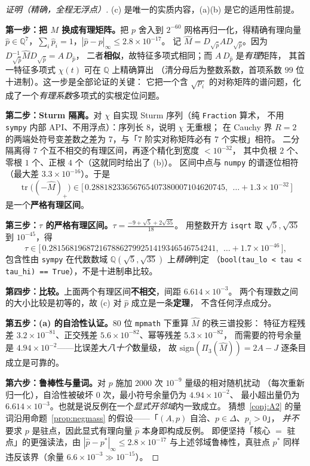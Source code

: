 \documentclass[UTF8,11pt]{ctexart}
\theoremstyle{definition}
\newcommand{\tr}{\operatorname{tr}}
\newcommand{\Q}{\mathbb{Q}}
\begin{document}
\begin{proof}[证明（精确，全程无浮点）]
(c) 是唯一的实质内容，(a)(b) 是它的适用性前提。

\textbf{第一步：把 $M$ 换成有理矩阵。}把 $p$ 舍入到 $2^{-60}$ 网格再归一化，得精确有理向量
$\hat p\in\Q^7$，$\sum_i\hat p_i=1$，$|\hat p-p|_\infty\le2.8\times10^{-17}$。
记 $\hat M=D_{\sqrt{\hat p}}AD_{\sqrt{\hat p}}$。因为
$D_{\sqrt{\hat p}}^{-1}\hat M D_{\sqrt{\hat p}}=A\,D_{\hat p}$，
二者\textbf{相似}，故特征多项式相同；而 $A\,D_{\hat p}$ 是\emph{有理}矩阵，
其首一特征多项式 $\chi(t)$ 可在 $\Q$ 上精确算出
（清分母后为整数系数，首项系数 $99$ 位十进制）。这一步是全部论证的关键：
它把一个含 $\sqrt{p_i}$ 的对称矩阵的谱问题，化成了一个\emph{有理系数}多项式的实根定位问题。

\textbf{第二步：Sturm 隔离。}对 $\chi$ 自实现 Sturm 序列（纯 \texttt{Fraction} 算术，
不用 \texttt{sympy} 内部 API、不用浮点）：序列长 $8$，说明 $\chi$ 无重根；
在 Cauchy 界 $R=2$ 的两端处符号变差数之差为 $7$，与「$7$ 阶实对称矩阵必有 $7$ 个实根」相符。
二分隔离得 $7$ 个互不相交的有理区间，再逐个精化到宽度 $<10^{-32}$，
其中负根 $2$ 个、零根 $1$ 个、正根 $4$ 个（这就同时给出了 (b)）。
区间中点与 \texttt{numpy} 的谱逐位相符（最大差 $3.3\times10^{-16}$）。于是
\[
\tr\bigl((-{\hat M})_+\bigr)\in
\bigl[\,0.28818233656765407380007104620745,\ \ \ldots+1.3\times10^{-32}\,\bigr]
\]
是一个\textbf{严格有理区间}。

\textbf{第三步：$\tau$ 的严格有理区间。}$\tau=\frac{-9+\sqrt5+2\sqrt{35}}{18}$。
用整数开方 \texttt{isqrt} 取 $\sqrt5,\sqrt{35}$ 到 $10^{-45}$，得
\[
\tau\in\bigl[\,0.2815681968721678862799251419346546754241,\ \ \ldots+1.7\times10^{-46}\,\bigr],
\]
包含性由 \texttt{sympy} 在代数数域 $\Q(\sqrt5,\sqrt{35})$ 上\emph{精确}判定
（\texttt{bool(tau\_lo < tau < tau\_hi) == True}），不是十进制串比较。

\textbf{第四步：比较。}上面两个有理区间\textbf{不相交}，间距 $6.614\times10^{-3}$。
两个有理数之间的大小比较是初等的，故 (c) 对 $\hat p$ 成立是一条\textbf{定理}，
不含任何浮点成分。

\textbf{第五步：(a) 的自洽性认证。}$80$ 位 \texttt{mpmath} 下重算 $\hat M$ 的秩三谱投影：
特征方程残差 $3.2\times10^{-81}$、正交残差 $5.6\times10^{-82}$、幂等残差 $5.3\times10^{-82}$，
而需要的符号余量是 $4.94\times10^{-2}$——比误差大\emph{八十个}数量级，
故 $\mathrm{sign}(\Pi_3(\hat M))=2A-J$ 逐条目成立是可靠的。

\textbf{第六步：鲁棒性与量词。}对 $p$ 施加 $2000$ 次 $10^{-9}$ 量级的相对随机扰动
（每次重新归一化），自洽性被破坏 $0$ 次，最小符号余量仍为 $4.94\times10^{-2}$、
最小超出量仍为 $6.614\times10^{-3}$。也就是说反例在一个\emph{显式开邻域}内一致成立。
猜想~\ref{conj:A2} 的量词沿用命题~\ref{prop:negmass} 的假设——「$(A,p)$ 自洽、$p\in\Delta$、$p_i>0$」，
\emph{并不}要求 $p$ 是驻点，因此显式有理向量 $\hat p$ 本身即构成反例。
即便坚持「核心 $=$ 驻点」的更强读法，由 $|\hat p-p^*|_\infty\le2.8\times10^{-17}$
与上述邻域鲁棒性，真驻点 $p^*$ 同样违反该界（余量 $6.6\times10^{-3}\gg10^{-15}$）。
\end{proof}
\end{document}
